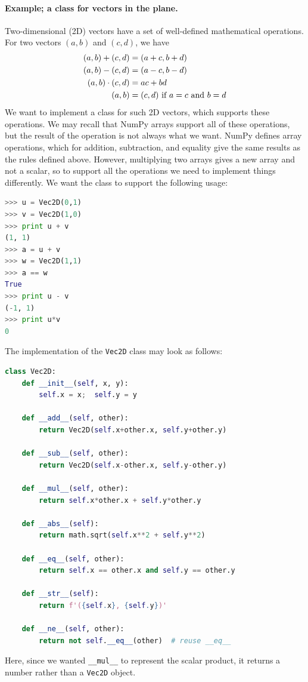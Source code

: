 \documentclass[graybox,envcountchap,sectrefs,final]{svmonodo}
\begin{document}
\paragraph{Example; a class for vectors in the plane.}
Two-dimensional (2D) vectors have a set of well-defined mathematical operations. For two vectors $(a,b)$ and $(c,d)$, we
have
\begin{align*}
(a,b) + (c,d) &= (a+c, b+d)\\ 
(a,b) - (c,d) &= (a-c, b-d)\\ 
(a,b)\cdot(c,d) &= ac + bd\\ 
(a,b) &= (c, d)\hbox{ if }a=c\hbox{ and }b=d
\end{align*}
We want to implement a class for such 2D vectors, which supports these operations.
We may recall that NumPy arrays support all of these operations, but the result of the operation is not
always what we want. NumPy defines array operations, which for addition, subtraction, and equality
give the same results as the rules defined above. However, multiplying two arrays gives a new array and not a scalar,
so to support all the operations we need to implement things differently. We want the class
to support the following usage:
\begin{lstlisting}[language=Python,style=blue1]
>>> u = Vec2D(0,1)
>>> v = Vec2D(1,0)
>>> print u + v
(1, 1)
>>> a = u + v
>>> w = Vec2D(1,1)
>>> a == w
True
>>> print u - v
(-1, 1)
>>> print u*v
0
\end{lstlisting}
The implementation of the \texttt{Vec2D} class may look as follows:
\begin{lstlisting}[language=Python,style=blue1]
 class Vec2D:
    def __init__(self, x, y):
        self.x = x;  self.y = y

    def __add__(self, other):
        return Vec2D(self.x+other.x, self.y+other.y)

    def __sub__(self, other):
        return Vec2D(self.x-other.x, self.y-other.y)

    def __mul__(self, other):
        return self.x*other.x + self.y*other.y

    def __abs__(self):
        return math.sqrt(self.x**2 + self.y**2)

    def __eq__(self, other):
        return self.x == other.x and self.y == other.y

    def __str__(self):
        return f'({self.x}, {self.y})'

    def __ne__(self, other):
        return not self.__eq__(other)  # reuse __eq__
\end{lstlisting}
Here, since we wanted \Verb!__mul__! to represent the scalar product, it returns a number rather than a \texttt{Vec2D} object.
\end{document}
